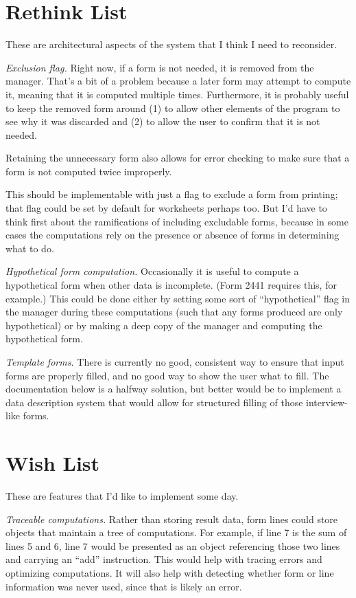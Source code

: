 \section{Rethink List}

These are architectural aspects of the system that I think I need to reconsider.

\emph{Exclusion flag.} Right now, if a form is not needed, it is removed from
the manager. That's a bit of a problem because a later form may attempt to
compute it, meaning that it is computed multiple times. Furthermore, it is
probably useful to keep the removed form around (1) to allow other elements of
the program to see why it was discarded and (2) to allow the user to confirm
that it is not needed.

Retaining the unnecessary form also allows for error checking to make sure that
a form is not computed twice improperly.

This should be implementable with just a flag to exclude a form from printing;
that flag could be set by default for worksheets perhaps too. But I'd have to
think first about the ramifications of including excludable forms, because in
some cases the computations rely on the presence or absence of forms in
determining what to do.

\emph{Hypothetical form computation.} Occasionally it is useful to compute a
hypothetical form when other data is incomplete. (Form 2441 requires this, for
example.) This could be done either by setting some sort of ``hypothetical''
flag in the manager during these computations (such that any forms produced are
only hypothetical) or by making a deep copy of the manager and computing the
hypothetical form.


\emph{Template forms.} There is currently no good, consistent way to ensure that
input forms are properly filled, and no good way to show the user what to fill.
The documentation below is a halfway solution, but better would be to implement
a data description system that would allow for structured filling of those
interview-like forms.




\section{Wish List}

These are features that I'd like to implement some day.


\emph{Traceable computations.} Rather than storing result data, form lines could
store objects that maintain a tree of computations. For example, if line 7 is
the sum of lines 5 and 6, line 7 would be presented as an object referencing
those two lines and carrying an ``add'' instruction. This would help with
tracing errors and optimizing computations. It will also help with detecting
whether form or line information was never used, since that is likely an error.


